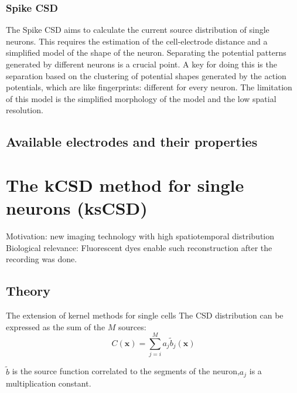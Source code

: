 \documentclass[12pt,a4paper]{article}
\begin{document}
  
\subsubsection{Spike CSD}
The Spike CSD \cite{Soma} aims to calculate the current source distribution of single neurons. This requires the estimation of the cell-electrode distance and a simplified model of the shape of the neuron. Separating the potential patterns generated by different neurons is a crucial point. A key for doing this is the separation based on the clustering of potential shapes generated by the action potentials, which are like fingerprints: different for every neuron. The limitation of this model is the simplified morphology of the model and the low spatial resolution.


\subsection{Available electrodes and their properties}


\section{The  kCSD method for single neurons (ksCSD)}
Motivation: new imaging technology with high spatiotemporal distribution
Biological relevance:   Fluorescent dyes enable such reconstruction after the recording was done.



\subsection{Theory}
The extension of kernel methods for single cells
The CSD distribution can be expressed as the sum of the $M$ sources: 
\begin{equation}
C (\textbf{x})= \sum_{j=i}^M a_j \tilde{b}_j(\textbf{x})
\end{equation}

$\tilde{b}$ is the source function correlated to the segments of the neuron,$a_j$ is a multiplication constant.
\end{document}
